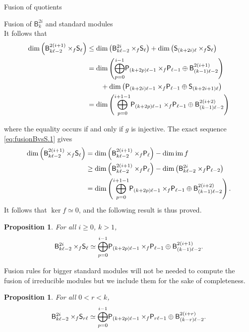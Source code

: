 \documentclass[reqno]{amsart}
\newtheorem{Prop}[Thm]{Proposition}
\newcommand{\ds}[1]{\mathsf S_{#1}}
\newcommand{\dP}[1]{\mathsf P_{#1}}
\newcommand{\xf}{\times\hspace{-0.27em}_f}
\newcommand{\B}[2]{\mathsf{B}^{#1}_{#2}}
\newcommand{\lc}{\ell}
\DeclareMathOperator{\im}{im}
\begin{document}
\begin{section}{Fusion of quotients}
\begin{subsection}{Fusion of $\B{2i}{k}$ and standard modules}
\begin{equation}
\end{equation}
It follows that 
\begin{align*}
	\dim \left(  \B{2(i+1)}{k \lc -2}\xf \ds{\lc} \right) & \leq \dim\left(\B{2i}{k \lc -2} \xf \ds{\lc}\right) + \dim\left( \ds{(k+2i)\lc}\xf \ds{\lc} \right) \\
	& = \dim \left( \overset{i-1}{\underset{p = 0}{\bigoplus}}\dP{(k+2p)\lc-1} \xf \dP{\lc-1} \oplus \B{2(i+1)}{(k-1)\lc-2}\right) \\
	& \qquad + \dim \left( \dP{(k+2i)\lc-1}\xf \dP{\lc-1} \oplus \ds{(k+2i +1)\lc}\right) \\
	& = \dim \left(\overset{i+1-1}{\underset{p = 0}{\bigoplus}}\dP{(k+2p)\lc-1} \xf \dP{\lc-1} \oplus \B{2(i+2)}{(k-1)\lc-2}  \right)
\end{align*}

where the equality occurs if and only if $g$ is injective. The exact sequence \eqref{eq:fusionBvsS.1} gives
\begin{align*}
	\dim \left(\B{2(i+1)}{k \lc -2}\xf \ds{\lc} \right)& = \dim \left( \B{2(i+1)}{k \lc -2} \xf \dP{\lc} \right) - \dim \im f \\
	& \geq \dim \left( \B{2(i+1)}{k \lc -2} \xf \dP{\lc} \right) - \dim \left( \B{2i}{k\lc -2} \xf \dP{\lc-2} \right) \\
	& =  \dim \left( \overset{i+1-1}{\underset{p = 0}{\bigoplus}}\dP{(k+2p)\lc-1} \xf \dP{\lc-1} \oplus \B{2(i+2)}{(k-1)\lc-2}\right).\\
\end{align*}
It follows that $\ker f \simeq 0$, and the following result is thus proved.
\begin{Prop}\label{prop:fusionBvsSl}
For all $i\geq 0$, $k>1$,
\begin{equation}
	\B{2i}{k \lc -2} \xf \ds{\lc} \simeq \overset{i-1}{\underset{p = 0}{\bigoplus}}\dP{(k+2p)\lc-1} \xf \dP{\lc-1} \oplus \B{2(i+1)}{(k-1)\lc-2}.
\end{equation}
\end{Prop}
Fusion rules for bigger standard modules will not be needed to compute the fusion of irreducible modules but we include them for the sake of completeness. 
\begin{Prop}
For all $0<r <k$,
\begin{equation}\label{eq:BvsSql}
\B{2i}{k \lc -2} \xf \ds{r \lc} \simeq \overset{i-1}{\underset{p = 0}{\bigoplus}}\dP{(k+2p)\lc-1} \xf \dP{r\lc-1} \oplus \B{2(i+r)}{(k-r)\lc-2}.
\end{equation}
\end{Prop}

\end{subsection}
\end{section}
\end{document}
